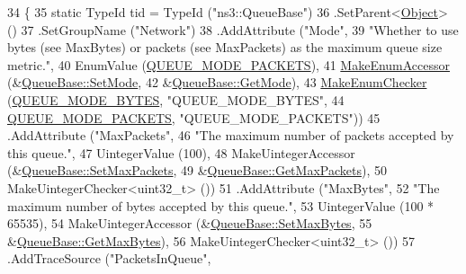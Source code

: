 \begin{DoxyCode}
34 \{
35   \textcolor{keyword}{static} TypeId tid = TypeId (\textcolor{stringliteral}{"ns3::QueueBase"})
36     .SetParent<\hyperlink{classns3_1_1Object_a40860402e64d8008fb42329df7097cdb}{Object}> ()
37     .SetGroupName (\textcolor{stringliteral}{"Network"})
38     .AddAttribute (\textcolor{stringliteral}{"Mode"},
39                    \textcolor{stringliteral}{"Whether to use bytes (see MaxBytes) or packets (see MaxPackets) as the maximum queue
       size metric."},
40                    EnumValue (\hyperlink{classns3_1_1QueueBase_adc473162c2a2bcb3d76d151d6d7ee02aa68a809be7a09a4c4c7d8feb37f2f7a9d}{QUEUE\_MODE\_PACKETS}),
41                    \hyperlink{namespacens3_af5050739867ce63896dec011e332c8ec}{MakeEnumAccessor} (&\hyperlink{classns3_1_1QueueBase_ad0961289c94853928a1cf69dd2d93e8d}{QueueBase::SetMode},
42                                      &\hyperlink{classns3_1_1QueueBase_a8f711a128861891658c52537d7645793}{QueueBase::GetMode}),
43                    \hyperlink{namespacens3_a48832781a2b521d3d0091e05ece30615}{MakeEnumChecker} (\hyperlink{classns3_1_1QueueBase_adc473162c2a2bcb3d76d151d6d7ee02aa141eeb76bf0704ba0fdb23b04ffc3453}{QUEUE\_MODE\_BYTES}, \textcolor{stringliteral}{"QUEUE\_MODE\_BYTES"},
44                                     \hyperlink{classns3_1_1QueueBase_adc473162c2a2bcb3d76d151d6d7ee02aa68a809be7a09a4c4c7d8feb37f2f7a9d}{QUEUE\_MODE\_PACKETS}, \textcolor{stringliteral}{"QUEUE\_MODE\_PACKETS"}))
45     .AddAttribute (\textcolor{stringliteral}{"MaxPackets"},
46                    \textcolor{stringliteral}{"The maximum number of packets accepted by this queue."},
47                    UintegerValue (100),
48                    MakeUintegerAccessor (&\hyperlink{classns3_1_1QueueBase_a5e7bd286a0c1008f4c65ab3c9a48abd9}{QueueBase::SetMaxPackets},
49                                          &\hyperlink{classns3_1_1QueueBase_a7e1501be3f36c87c57dc3e807f925a07}{QueueBase::GetMaxPackets}),
50                    MakeUintegerChecker<uint32\_t> ())
51     .AddAttribute (\textcolor{stringliteral}{"MaxBytes"},
52                    \textcolor{stringliteral}{"The maximum number of bytes accepted by this queue."},
53                    UintegerValue (100 * 65535),
54                    MakeUintegerAccessor (&\hyperlink{classns3_1_1QueueBase_a65f35ec9f4405292011a57cc6d2f59f9}{QueueBase::SetMaxBytes},
55                                          &\hyperlink{classns3_1_1QueueBase_adc3e321231c0b44b622242d65d2bdbd2}{QueueBase::GetMaxBytes}),
56                    MakeUintegerChecker<uint32\_t> ())
57     .AddTraceSource (\textcolor{stringliteral}{"PacketsInQueue"},

\end{DoxyCode}
